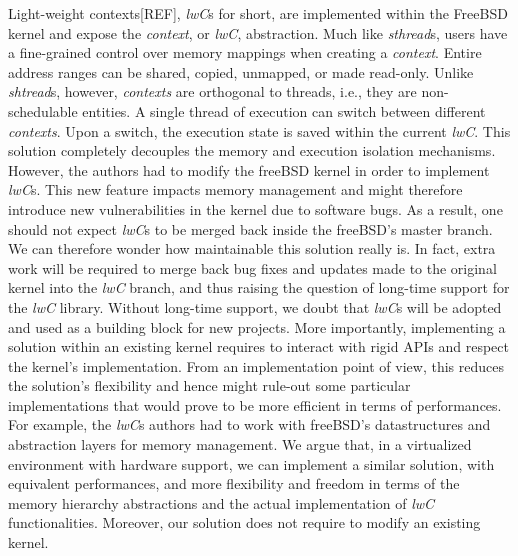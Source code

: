 \documentclass[letterpaper,twocolumn,10pt]{article}
\begin{document}
Light-weight contexts[REF], \emph{lwC}s for short, are implemented within the FreeBSD kernel and expose the \emph{context}, or \emph{lwC}, abstraction.
Much like \emph{sthread}s, users have a fine-grained control over memory mappings when creating a \emph{context}.
Entire address ranges can be shared, copied, unmapped, or made read-only.
Unlike \emph{shtread}s, however, \emph{contexts} are orthogonal to threads, i.e., they are non-schedulable entities.
A single thread of execution can switch between different \emph{contexts}.
Upon a switch, the execution state is saved within the current \emph{lwC}.
This solution completely decouples the memory and execution isolation mechanisms.
However, the authors had to modify the freeBSD kernel in order to implement \emph{lwC}s.
This new feature impacts memory management and might therefore introduce new vulnerabilities in the kernel due to software bugs.
As a result, one should not expect \emph{lwC}s to be merged back inside the freeBSD's master branch.
We can therefore wonder how maintainable this solution really is.
In fact, extra work will be required to merge back bug fixes and updates made to the original kernel into the \emph{lwC} branch, and thus raising the question of long-time support for the \emph{lwC} library.
Without long-time support, we doubt that \emph{lwC}s will be adopted and used as a building block for new projects.
More importantly, implementing a solution within an existing kernel requires to interact with rigid APIs and respect the kernel's implementation.
From an implementation point of view, this reduces the solution's flexibility and hence might rule-out some particular implementations that would prove to be more efficient in terms of performances.
For example, the \emph{lwC}s authors had to work with freeBSD's datastructures and abstraction layers for memory management.
We argue that, in a virtualized environment with hardware support, we can implement a similar solution, with equivalent performances, and more flexibility and freedom in terms of the memory hierarchy abstractions and the actual implementation of \emph{lwC} functionalities.
Moreover, our solution does not require to modify an existing kernel.
%
%
%
\end{document}
